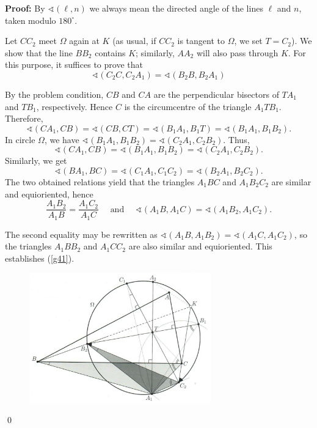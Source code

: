 \documentclass[a4paper, 12pt]{article}
\begin{document}
\begin{enumerate}
\textbf{Proof: } By $\sphericalangle (\ell, n)$ we always mean the directed angle of the lines $\ell$ and $n$, taken modulo $180^\circ$.

Let $CC_2$ meet $\Omega$ again at $K$ (as usual, if $CC_2$ is tangent to $\Omega$, we set $T = C_2$). We show that the line $BB_2$ contains $K$; similarly, $AA_2$ will also pass through $K$. For this purpose, it suffices to prove that
\begin{equation} \label{g41}
    \sphericalangle (C_2C, C_2A_1) = \sphericalangle (B_2 B, B_2A_1)
\end{equation}

By the problem condition, $CB$ and $CA$ are the perpendicular bisectors of $TA_1$ and $TB_1$, respectively. Hence $C$ is the circumcentre of the triangle $A_1 T B_1$. Therefore,
$$
\sphericalangle (CA_1, CB) = \sphericalangle (CB, CT) = \sphericalangle (B_1 A_1, B_1T) = \sphericalangle (B_1 A_1, B_1 B_2).
$$
In circle $\Omega$, we have $\sphericalangle (B_1 A_1, B_1 B_2) = \sphericalangle (C_2 A_1, C_2 B_2)$. Thus,
$$
\sphericalangle(CA_1, CB) = \sphericalangle(B_1 A_1, B_1 B_2) = \sphericalangle(C_2 A_1, C_2 B_2).
$$
Similarly, we get
$$
\sphericalangle (BA_1, BC) = \sphericalangle (C_1 A_1, C_1 C_2) = \sphericalangle (B_2 A_1, B_2 C_2).
$$
The two obtained relations yield that the triangles $A_1 BC$ and $A_1 B_2 C_2$ are similar and equioriented, hence
$$
\frac{A_1 B_2}{A_1 B} = \frac{A_1 C_2}{A_1 C} \quad 
\textrm{ and } \quad 
\sphericalangle(A_1 B, A_1 C) = \sphericalangle (A_1 B_2, A_1 C_2).
$$

The second equality may be rewritten as $\sphericalangle(A_1 B, A_1 B_2) = \sphericalangle (A_1 C, A_1 C_2)$, so the triangles $A_1 B B_2$ and $A_1 C C_2$ are also similar and equioriented. This establishes (\ref{g41}).


\begin{figure}[h]
    \centering
    \includegraphics[width = 0.7\textwidth]{2018_G4}
\end{figure}


\qed
\vspace{6mm}


    

\end{enumerate}
\end{document}
